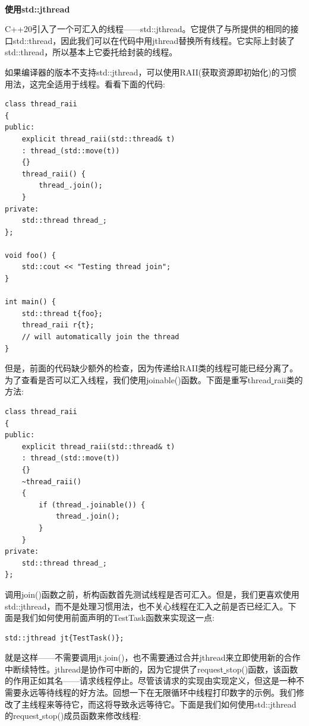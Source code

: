 \noindent\textbf{}\ \par
\textbf{使用std::jthread} \ \par
C++20引入了一个可汇入的线程——std::jthread。它提供了与所提供的相同的接口std::thread，因此我们可以在代码中用jthread替换所有线程。它实际上封装了std::thread，所以基本上它委托给封装的线程。 \par
如果编译器的版本不支持std::jthread，可以使用RAII(获取资源即初始化)的习惯用法，这完全适用于线程。看看下面的代码: \par

\begin{lstlisting}[caption={}]
class thread_raii
{
public:
	explicit thread_raii(std::thread& t)
	: thread_(std::move(t))
	{}
	thread_raii() {
		thread_.join();
	}
private:
	std::thread thread_;
};

void foo() {
	std::cout << "Testing thread join";
}

int main() {
	std::thread t{foo};
	thread_raii r{t};
	// will automatically join the thread
}
\end{lstlisting}

但是，前面的代码缺少额外的检查，因为传递给RAII类的线程可能已经分离了。为了查看是否可以汇入线程，我们使用joinable()函数。下面是重写thread\underline{ }raii类的方法: \par

\begin{lstlisting}[caption={}]
class thread_raii
{
public:
	explicit thread_raii(std::thread& t)
	: thread_(std::move(t))
	{}
	~thread_raii()
	{
		if (thread_.joinable()) {
			thread_.join();
		}
	}
private:
	std::thread thread_;
};
\end{lstlisting}

调用join()函数之前，析构函数首先测试线程是否可汇入。但是，我们更喜欢使用std::jthread，而不是处理习惯用法，也不关心线程在汇入之前是否已经汇入。下面是我们如何使用前面声明的TestTask函数来实现这一点: \par

\begin{lstlisting}[caption={}]
std::jthread jt{TestTask()};
\end{lstlisting}

就是这样——不需要调用jt.join()，也不需要通过合并jthread来立即使用新的合作中断续特性。jthread是协作可中断的，因为它提供了request\underline{ }stop()函数，该函数的作用正如其名——请求线程停止。尽管该请求的实现由实现定义，但这是一种不需要永远等待线程的好方法。回想一下在无限循环中线程打印数字的示例。我们修改了主线程来等待它，而这将导致永远等待它。下面是我们如何使用std::jthread的request\underline{ }stop()成员函数来修改线程: \par

